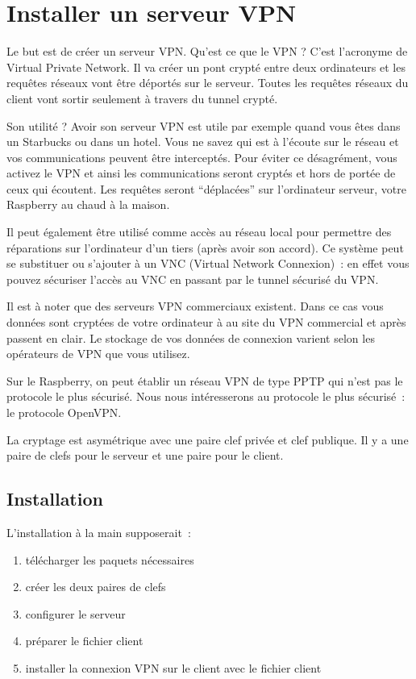 \section{Installer un serveur VPN}

Le but est de créer un serveur VPN. Qu'est ce que le VPN ? C'est l'acronyme de Virtual Private Network. Il va créer un pont crypté entre deux ordinateurs et les requêtes réseaux vont être déportés sur le serveur. Toutes les requêtes réseaux du client vont sortir seulement à travers du tunnel crypté.

Son utilité ? Avoir son serveur VPN est utile par exemple quand vous êtes dans un Starbucks ou dans un hotel. Vous ne savez qui est à l'écoute sur le réseau et vos communications peuvent être interceptés. Pour éviter ce désagrément, vous activez le VPN et ainsi les communications seront cryptés et hors de portée de ceux qui écoutent. Les requêtes seront ``déplacées'' sur l'ordinateur serveur, votre Raspberry au chaud à la maison.

Il peut également être utilisé comme accès au réseau local pour permettre des réparations sur l'ordinateur d'un tiers (après avoir son accord). Ce système peut se substituer ou s'ajouter à un VNC (Virtual Network Connexion)~: en effet vous pouvez sécuriser l'accès au VNC en passant par le tunnel sécurisé du VPN.

Il est à noter que des serveurs VPN commerciaux existent. Dans ce cas vous données sont cryptées de votre ordinateur à au site du VPN commercial et après passent en clair. Le stockage de vos données de connexion varient selon les opérateurs de VPN que vous utilisez. 

Sur le Raspberry, on peut établir un réseau VPN de type PPTP qui n'est pas le protocole le plus sécurisé. Nous nous intéresserons au protocole le plus sécurisé~: le protocole OpenVPN.

La cryptage est asymétrique avec une paire clef privée et clef publique. Il y a une paire de clefs pour le serveur et une paire pour le client.

\subsection{Installation}

L'installation à la main supposerait~:
\begin{enumerate}
	\item télécharger les paquets nécessaires
	\item créer les deux paires de clefs
	\item configurer le serveur
	\item préparer le fichier client
	\item installer la connexion VPN sur le client avec le fichier client
\end{enumerate}


